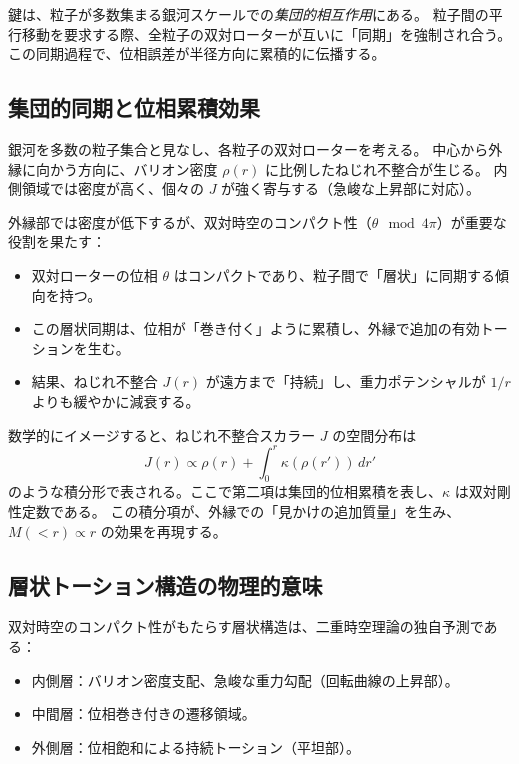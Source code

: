 \documentclass[dvipdfmx,a4paper]{jsbook}
\theoremstyle{definition}
\theoremstyle{remark}
\begin{document}
鍵は、粒子が多数集まる銀河スケールでの\emph{集団的相互作用}にある。  
粒子間の平行移動を要求する際、全粒子の双対ローターが互いに「同期」を強制され合う。  
この同期過程で、位相誤差が半径方向に累積的に伝播する。

\subsection{集団的同期と位相累積効果}

銀河を多数の粒子集合と見なし、各粒子の双対ローターを考える。  
中心から外縁に向かう方向に、バリオン密度 $\rho(r)$ に比例したねじれ不整合が生じる。  
内側領域では密度が高く、個々の $J$ が強く寄与する（急峻な上昇部に対応）。  

外縁部では密度が低下するが、双対時空のコンパクト性（$\theta \mod 4\pi$）が重要な役割を果たす：
\begin{itemize}
  \item 双対ローターの位相 $\theta$ はコンパクトであり、粒子間で「層状」に同期する傾向を持つ。
  \item この層状同期は、位相が「巻き付く」ように累積し、外縁で追加の有効トーションを生む。
  \item 結果、ねじれ不整合 $J(r)$ が遠方まで「持続」し、重力ポテンシャルが $1/r$ よりも緩やかに減衰する。
\end{itemize}

数学的にイメージすると、ねじれ不整合スカラー $J$ の空間分布は
\begin{equation}
  J(r) \propto \rho(r) + \int_0^r \kappa(\rho(r')) \, dr'
  \label{eq:J-cumulative}
\end{equation}
のような積分形で表される。ここで第二項は集団的位相累積を表し、$\kappa$ は双対剛性定数である。  
この積分項が、外縁での「見かけの追加質量」を生み、$M(<r) \propto r$ の効果を再現する。

\subsection{層状トーション構造の物理的意味}

双対時空のコンパクト性がもたらす層状構造は、二重時空理論の独自予測である：
\begin{itemize}
  \item 内側層：バリオン密度支配、急峻な重力勾配（回転曲線の上昇部）。
  \item 中間層：位相巻き付きの遷移領域。
  \item 外側層：位相飽和による持続トーション（平坦部）。
\end{itemize}
\end{document}

